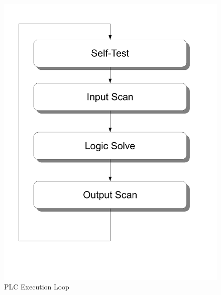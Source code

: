 \begin{figure}[htb]
    \centering
    \includegraphics[width=\imgmedphoto]{./images/plcexecution.pdf}
    \caption{PLC Execution Loop}
    \label{fig:plcexecution}
\end{figure}

